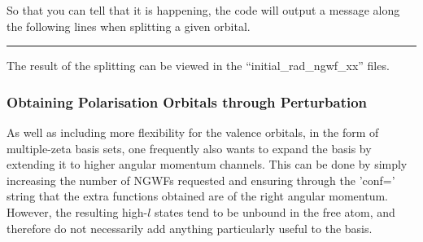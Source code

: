 \documentclass[letterpaper,10pt,english]{sphinxmanual}
\begin{document}
So that you can tell that it is happening, the code will output a
message along the following lines when splitting a given orbital.


\bigskip\hrule\bigskip




The result of the splitting can be viewed in the
“initial\_rad\_ngwf\_xx” files.


\subsubsection{Obtaining Polarisation Orbitals through Perturbation}
\label{\detokenize{pseudoatomic_solver:obtaining-polarisation-orbitals-through-perturbation}}
As well as including more flexibility for the valence orbitals, in the
form of multiple-zeta basis sets, one frequently also wants to expand
the basis by extending it to higher angular momentum channels. This can
be done by simply increasing the number of NGWFs requested and ensuring
through the ’conf=’ string that the extra functions obtained are of the
right angular momentum. However, the resulting high-\(l\) states
tend to be unbound in the free atom, and therefore do not necessarily
add anything particularly useful to the basis.
\end{document}
